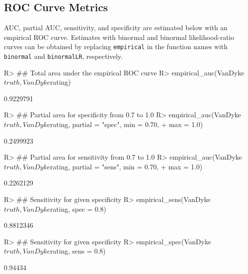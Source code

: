 \documentclass[
]{jss}
\begin{document}
\hypertarget{roc-curve-metrics}{%
\subsection{ROC Curve Metrics}\label{roc-curve-metrics}}

AUC, partial AUC, sensitivity, and specificity are estimated below with
an empirical ROC curve. Estimates with binormal and binormal
likelihood-ratio curves can be obtained by replacing \texttt{empirical}
in the function names with \texttt{binormal} and \texttt{binormalLR},
respectively.

\begin{CodeChunk}
\begin{CodeInput}
R> ## Total area under the empirical ROC curve
R> empirical_auc(VanDyke$truth, VanDyke$rating)
\end{CodeInput}
\begin{CodeOutput}
[1] 0.9229791
\end{CodeOutput}
\begin{CodeInput}
R> ## Partial area for specificity from 0.7 to 1.0
R> empirical_auc(VanDyke$truth, VanDyke$rating, partial = "spec", min = 0.70,
+               max = 1.0)
\end{CodeInput}
\begin{CodeOutput}
[1] 0.2499923
\end{CodeOutput}
\begin{CodeInput}
R> ## Partial area for sensitivity from 0.7 to 1.0
R> empirical_auc(VanDyke$truth, VanDyke$rating, partial = "sens", min = 0.70,
+               max = 1.0)
\end{CodeInput}
\begin{CodeOutput}
[1] 0.2262129
\end{CodeOutput}
\begin{CodeInput}
R> ## Sensitivity for given specificity
R> empirical_sens(VanDyke$truth, VanDyke$rating, spec = 0.8)
\end{CodeInput}
\begin{CodeOutput}
[1] 0.8812346
\end{CodeOutput}
\begin{CodeInput}
R> ## Sensitivity for given specificity
R> empirical_spec(VanDyke$truth, VanDyke$rating, sens = 0.8)
\end{CodeInput}
\begin{CodeOutput}
[1] 0.94434
\end{CodeOutput}
\end{CodeChunk}
\end{document}
